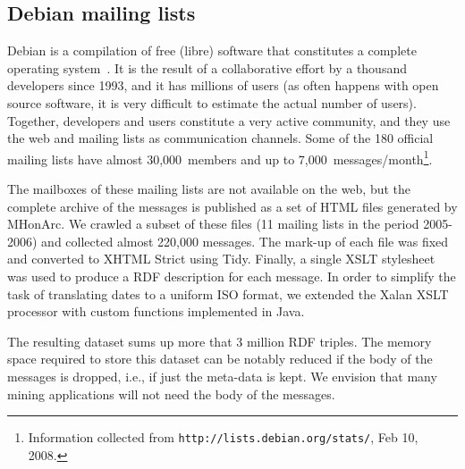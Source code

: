\documentclass{../templates/www2008-submission}
\begin{document}
\subsection{\label{sec:debian}Debian mailing lists}

Debian is a compilation of free (libre) software that constitutes a
complete operating system~\cite{Krafft2005}. It is the result of a
collaborative effort by a thousand developers since 1993, and it has
millions of users (as often happens with open source software, it is very
difficult to estimate the actual number of users). Together, developers
and users constitute a very active community, and they use the web and
mailing lists as communication channels. Some of the 180 official mailing
lists have almost 30,000~members and up to
7,000~messages/month\footnote{Information collected from \texttt{http://lists.debian.org/stats/}, Feb 10, 2008.}.

The mailboxes of these mailing lists are not available on the web, but
the complete archive of the messages is published as a set of
HTML files generated by MHonArc. We crawled a subset of these files
(11 mailing lists in the period 2005-2006) and collected almost 220,000
messages. The mark-up of each file was fixed and converted to XHTML Strict
using Tidy. Finally, a single XSLT stylesheet was used to produce a
RDF description for each message. In order to simplify the
task of translating dates to a uniform ISO format, we extended
the Xalan XSLT processor with custom functions implemented in Java.

The resulting dataset sums up more that 3 million RDF triples. The
memory space required to store this dataset can be notably
reduced if the body of the messages is dropped, i.e., if just the meta-data
is kept. We envision that many mining applications will not need the
body of the messages.

%
%
\end{document}

